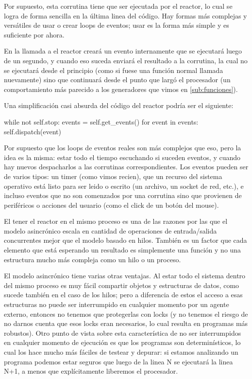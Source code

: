 Por supuesto, esta corrutina tiene que ser ejecutada por el reactor, lo cual se logra de forma sencilla en la última linea del código. Hay formas más complejas y versátiles de usar o crear loops de eventos; usar  es la forma más simple y es suficiente por ahora.

En la llamada a  el reactor creará un evento internamente que se ejecutará luego de un segundo, y cuando eso suceda enviará el resultado a la corrutina, la cual no se ejecutará desde el principio (como si fuese una función normal llamada nuevamente) sino que continuará desde el punto que largó el procesador (un comportamiento más parecido a los generadores que vimos en \ref{sub:funciones}).

Una simplificación casi absurda del código del reactor podría ser el siguiente:

\begin{py}
while not self.stop:
    events = self.get_events()
    for event in events:
        self.dispatch(event)
\end{py}

Por supuesto que los loops de eventos reales son más complejos que eso, pero la idea es la misma: estar todo el tiempo escuchando si suceden eventos, y cuando hay nuevos despacharlos a las corrutinas correspondientes. Los eventos pueden ser de varios tipos: un timer (como vimos recien), que un recurso del sistema operativo está listo para ser leido o escrito (un archivo, un socket de red, etc.), e incluso eventos que no son comenzados por una corrutina sino que provienen de periféricos o acciones del usuario (como el click de un botón del mouse).

El tener el reactor en el mismo proceso es una de las razones por las que el modelo asincrónico escala en cantidad de operaciones de entrada/salida concurrentes mejor que el modelo basado en hilos. También es un factor que cada elemento que está esperando un resultado es simplemente una función y no una estructura mucho más compleja como un hilo o un proceso.

El modelo asincrónico tiene varias otras ventajas. Al estar todo el sistema dentro del mismo proceso es muy fácil compartir objetos y estructuras de datos, como sucede también en el caso de los hilos; pero a diferencia de estos el acceso a esas estructuras no puede ser interrumpido en cualquier momento por un agente externo, entonces no tenemos que protegerlas con locks (y no tenemos el riesgo de no darnos cuenta que esos locks eran necesarios, lo cual resulta en programas más robustos). Otro punto de vista sobre esta característica de no ser interrumpidos en cualquier momento de ejecución es que los programas son determinísticos, lo cual los hace mucho más fáciles de testear y depurar: si estamos analizando un programa podemos estar seguros que luego de la linea N se ejecutará la linea N+1, a menos que explícitamente liberemos el procesador.

